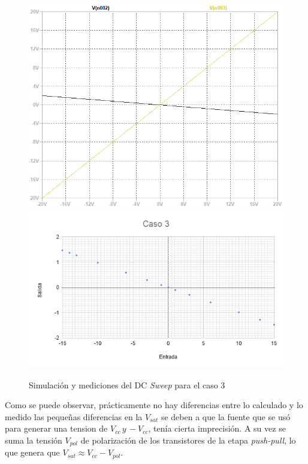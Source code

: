\begin{figure}[H]
\begin{centering}
\includegraphics[scale=0.4]{../Ex1/iA/Resources1a/dcswp3sim}\includegraphics[scale=0.4]{../Ex1/iA/Resources1a/DCSWEEP3MED}
\par\end{centering}
\caption{Simulación y mediciones del DC \emph{Sweep} para el caso 3}
\label{1_a_41}

\end{figure}

Como se puede observar, prácticamente no hay diferencias entre lo
calculado y lo medido las pequeñas diferencias en la $V_{sat}$ se
deben a que la fuente que se usó para generar una tension de $V_{cc}\,y\,-V_{cc}$,
tenía cierta imprecisión. A su vez se suma la tensión $V_{pol}$ de
polarización de los transistores de la etapa \emph{push-pull}, lo
que genera que $V_{sat}\approx V_{cc}-V_{pol}$.
